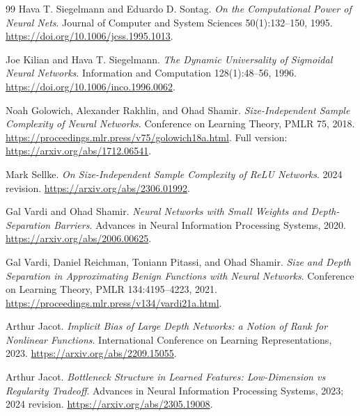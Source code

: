 \documentclass[11pt]{article}
\theoremstyle{remark}
\begin{document}
\begin{thebibliography}{99}
Hava T. Siegelmann and Eduardo D. Sontag.
\emph{On the Computational Power of Neural Nets}.
Journal of Computer and System Sciences 50(1):132--150, 1995.
\url{https://doi.org/10.1006/jcss.1995.1013}.

Joe Kilian and Hava T. Siegelmann.
\emph{The Dynamic Universality of Sigmoidal Neural Networks}.
Information and Computation 128(1):48--56, 1996.
\url{https://doi.org/10.1006/inco.1996.0062}.

Noah Golowich, Alexander Rakhlin, and Ohad Shamir.
\emph{Size-Independent Sample Complexity of Neural Networks}.
Conference on Learning Theory, PMLR 75, 2018.
\url{https://proceedings.mlr.press/v75/golowich18a.html}.
Full version: \url{https://arxiv.org/abs/1712.06541}.

Mark Sellke.
\emph{On Size-Independent Sample Complexity of ReLU Networks}.
2024 revision.
\url{https://arxiv.org/abs/2306.01992}.

Gal Vardi and Ohad Shamir.
\emph{Neural Networks with Small Weights and Depth-Separation Barriers}.
Advances in Neural Information Processing Systems, 2020.
\url{https://arxiv.org/abs/2006.00625}.

Gal Vardi, Daniel Reichman, Toniann Pitassi, and Ohad Shamir.
\emph{Size and Depth Separation in Approximating Benign Functions
with Neural Networks}.
Conference on Learning Theory, PMLR 134:4195--4223, 2021.
\url{https://proceedings.mlr.press/v134/vardi21a.html}.

Arthur Jacot.
\emph{Implicit Bias of Large Depth Networks: a Notion of Rank
for Nonlinear Functions}.
International Conference on Learning Representations, 2023.
\url{https://arxiv.org/abs/2209.15055}.

Arthur Jacot.
\emph{Bottleneck Structure in Learned Features:
Low-Dimension vs Regularity Tradeoff}.
Advances in Neural Information Processing Systems, 2023;
2024 revision. \url{https://arxiv.org/abs/2305.19008}.
\end{thebibliography}
\end{document}
